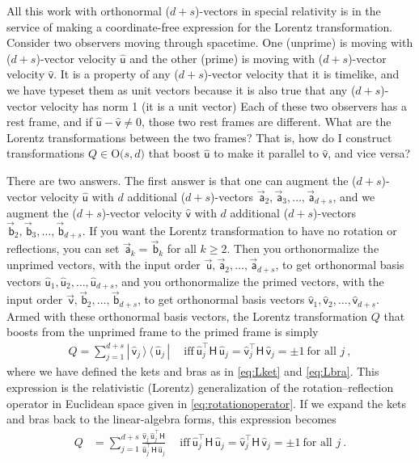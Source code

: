 \documentclass{article}
\newcommand{\metric}{\mathsf{H}}
\newcommand\upvec[1]{\!\vec{\,\mathrm{#1}}}
\newcommand{\Lvec}[1]{\upvec{\mathsf{#1}}} %
\newcommand{\Lhat}[1]{\hat{\mathsf{#1}}} %
\newcommand{\ketbra}[2]{|\,{#1}\,\rangle\,\langle\,{#2}\,|}
\newcommand{\plus}{\!+\!} %
\begin{document}
All this work with orthonormal ($d\plus s$)-vectors in special relativity is in the service of making a coordinate-free expression for the Lorentz transformation.
Consider two observers moving through spacetime.
One (unprime) is moving with ($d\plus s$)-vector velocity $\Lhat{u}$ and the other (prime) is moving with ($d\plus s$)-vector velocity $\Lhat{v}$.
It is a property of any ($d\plus s$)-vector velocity that it is timelike, and we have typeset them as unit vectors because it is also true that any ($d\plus s$)-vector velocity has norm 1 (it is a unit vector)
Each of these two observers has a rest frame, and if $\Lhat{u}-\Lhat{v}\neq 0$, those two rest frames are different.
What are the Lorentz transformations between the two frames?
That is, how do I construct transformations $Q\in\mbox{O($s,d$)}$ that boost $\Lhat{u}$ to make it parallel to $\Lhat{v}$, and vice versa?

There are two answers.
The first answer is that one can augment the ($d\plus s$)-vector velocity $\Lhat{u}$ with $d$ additional ($d\plus s$)-vectors $\Lvec{a}_2,\Lvec{a}_3,\ldots,\Lvec{a}_{d+s}$, and we augment the ($d\plus s$)-vector velocity $\Lhat{v}$ with $d$ additional ($d\plus s$)-vectors $\Lvec{b}_2,\Lvec{b}_3,\ldots,\Lvec{b}_{d+s}$.
If you want the Lorentz transformation to have no rotation or reflections, you can set $\Lvec{a}_k=\Lvec{b}_k$ for all $k\geq 2$.
Then you orthonormalize the unprimed vectors, with the input order $\Lvec{u},\Lvec{a}_2,\ldots,\Lvec{a}_{d+s}$, to get orthonormal basis vectors $\Lhat{u}_1,\Lhat{u}_2,\ldots,\Lhat{u}_{d+s}$, and you orthonormalize the primed vectors, with the input order $\Lvec{v},\Lvec{b}_2,\ldots,\Lvec{b}_{d+s}$, to get orthonormal basis vectors $\Lhat{v}_1,\Lhat{v}_2,\ldots,\Lhat{v}_{d+s}$.
Armed with these orthonormal basis vectors, the Lorentz transformation $Q$ that boosts from the unprimed frame to the primed frame is simply
\begin{align}
  Q = \sum_{j=1}^{d+s} \ketbra{\Lhat{v}_j}{\Lhat{u}_j} \quad~ \mbox{iff} ~ \Lhat{u}_j^\top\metric\,\Lhat{u}_j = \Lhat{v}_j^\top\metric\,\Lhat{v}_j = \pm 1 ~ \mbox{for all $j$} \label{eq:LTQM} ~,
\end{align}
where we have defined the kets and bras as in \eqref{eq:Lket} and \eqref{eq:Lbra}.
This expression is the relativistic (Lorentz) generalization of the rotation--reflection operator in Euclidean space given in \eqref{eq:rotationoperator}.
If we expand the kets and bras back to the linear-algebra forms, this expression becomes
\begin{align}
  Q &= \sum_{j=1}^{d+s} \frac{\Lhat{v}_j\,\Lhat{u}_j^\top\metric}{\Lhat{u}_j^\top\metric\,\Lhat{u}_j} \quad~ \mbox{iff} ~ \Lhat{u}_j^\top\metric\,\Lhat{u}_j = \Lhat{v}_j^\top\metric\,\Lhat{v}_j = \pm 1 ~ \mbox{for all $j$} ~.
\end{align}
\end{document}
